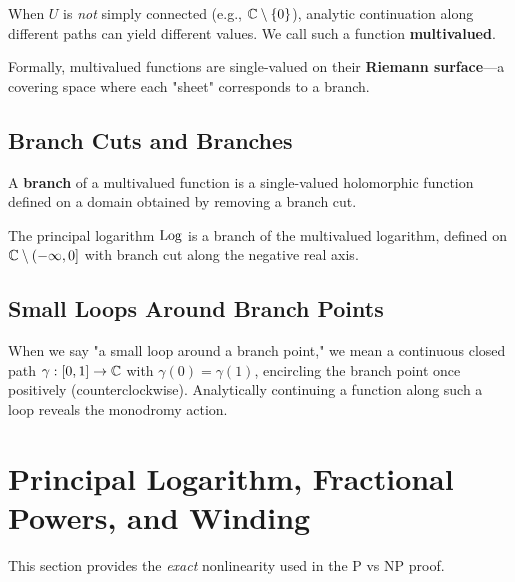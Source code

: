 \begin{remark}
When $U$ is \textit{not} simply connected (e.g., $\mathbb{C} \setminus \{0\}$), analytic continuation along different paths can yield different values. We call such a function \textbf{multivalued}.

Formally, multivalued functions are single-valued on their \textbf{Riemann surface}—a covering space where each "sheet" corresponds to a branch.
\end{remark}

\subsection{Branch Cuts and Branches}

\begin{definition}[Branch]
A \textbf{branch} of a multivalued function is a single-valued holomorphic function defined on a domain obtained by removing a branch cut.
\end{definition}

\begin{example}
The principal logarithm $\operatorname{Log}$ is a branch of the multivalued logarithm, defined on $\mathbb{C} \setminus (-\infty, 0]$ with branch cut along the negative real axis.
\end{example}

\subsection{Small Loops Around Branch Points}

\begin{remark}
When we say "a small loop around a branch point," we mean a continuous closed path $\gamma: [0,1] \to \mathbb{C}$ with $\gamma(0) = \gamma(1)$, encircling the branch point once positively (counterclockwise). Analytically continuing a function along such a loop reveals the monodromy action.
\end{remark}

\section{Principal Logarithm, Fractional Powers, and Winding}
\label{sec:logarithm-fractional-powers}

This section provides the \textit{exact} nonlinearity used in the P vs NP proof.

